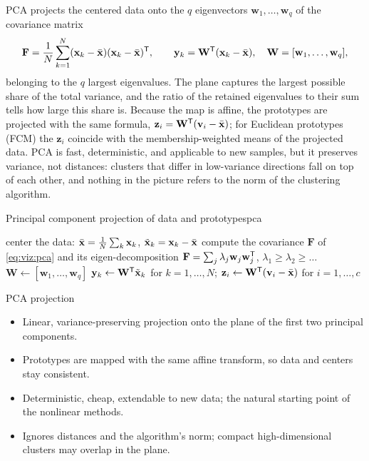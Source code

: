 PCA \cite{jolliffe:2002} projects the centered data onto the $q$ eigenvectors $\mathbf{w}_1,\dots,\mathbf{w}_q$ of the covariance matrix
\begin{equation}
  \mathbf{F} = \frac{1}{N}\sum_{k=1}^{N}(\mathbf{x}_k-\bar{\mathbf{x}})(\mathbf{x}_k-\bar{\mathbf{x}})^{\mathsf{T}},\qquad
  \mathbf{y}_k = \mathbf{W}^{\mathsf{T}}(\mathbf{x}_k-\bar{\mathbf{x}}),\quad \mathbf{W}=[\mathbf{w}_1,\dots,\mathbf{w}_q],
  \label{eq:viz:pca}
\end{equation}
belonging to the $q$ largest eigenvalues. The plane captures the largest possible share of the total variance, and the ratio of the retained eigenvalues to their sum tells how large this share is. Because the map is affine, the prototypes are projected with the same formula, $\mathbf{z}_i=\mathbf{W}^{\mathsf{T}}(\mathbf{v}_i-\bar{\mathbf{x}})$; for Euclidean prototypes (FCM) the $\mathbf{z}_i$ coincide with the membership-weighted means of the projected data. PCA is fast, deterministic, and applicable to new samples, but it preserves variance, not distances: clusters that differ in low-variance directions fall on top of each other, and nothing in the picture refers to the norm of the clustering algorithm.

\begin{algobox}{Principal component projection of data and prototypes}{pca}
\begin{algorithm}[H]
center the data: $\bar{\mathbf{x}}=\frac1N\sum_k\mathbf{x}_k$, $\tilde{\mathbf{x}}_k=\mathbf{x}_k-\bar{\mathbf{x}}$\;
compute the covariance $\mathbf{F}$ of \eqref{eq:viz:pca} and its eigen-decomposition $\mathbf{F}=\sum_j\lambda_j\mathbf{w}_j\mathbf{w}_j^{\mathsf{T}}$, $\lambda_1\ge\lambda_2\ge\dots$\;
$\mathbf{W}\leftarrow[\mathbf{w}_1,\dots,\mathbf{w}_q]$\;
$\mathbf{y}_k\leftarrow\mathbf{W}^{\mathsf{T}}\tilde{\mathbf{x}}_k$ for $k=1,\dots,N$; \quad $\mathbf{z}_i\leftarrow\mathbf{W}^{\mathsf{T}}(\mathbf{v}_i-\bar{\mathbf{x}})$ for $i=1,\dots,c$\;
\end{algorithm}
\end{algobox}
\begin{summarybox}{PCA projection}
\begin{itemize}
  \item Linear, variance-preserving projection onto the plane of the first two principal components.
  \item Prototypes are mapped with the same affine transform, so data and centers stay consistent.
  \item Deterministic, cheap, extendable to new data; the natural starting point of the nonlinear methods.
  \item Ignores distances and the algorithm's norm; compact high-dimensional clusters may overlap in the plane.
\end{itemize}
\end{summarybox}

